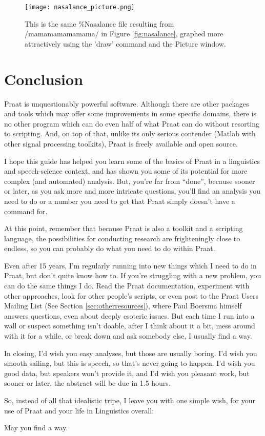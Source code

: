 \begin{figure}
  \centerline{
    \mbox{\texttt{[image: nasalance\_picture.png]}}
  }
  \caption{This is the same \%Nasalance file resulting from /mamamamamamama/ in Figure \ref{fig:nasalance}, graphed more attractively using the 'draw' command and the Picture window.}
  \label{fig:nasalancepretty}
  \end{figure}

\pagebreak

\hypertarget{conclusion}{%
\section{Conclusion}\label{conclusion}}

\label{conclusion}

Praat is unquestionably powerful software. Although there are other
packages and tools which may offer some improvements in some specific
domains, there is no other program which can do even half of what Praat
can do without resorting to scripting. And, on top of that, unlike its
only serious contender (Matlab with other signal processing toolkits),
Praat is freely available and open source.

I hope this guide has helped you learn some of the basics of Praat in a
linguistics and speech-science context, and has shown you some of its
potential for more complex (and automated) analysis. But, you're far
from ``done'', because sooner or later, as you ask more and more
intricate questions, you'll find an analysis you need to do or a number
you need to get that Praat simply doesn't have a command for.

At this point, remember that because Praat is also a toolkit and a
scripting language, the possibilities for conducting research are
frighteningly close to endless, so you can probably do what you need to
do within Praat.

Even after 15 years, I'm regularly running into new things which I need
to do in Praat, but don't quite know how to. If you're struggling with a
new problem, you can do the same things I do. Read the Praat
documentation, experiment with other approaches, look for other people's
scripts, or even post to the Praat Users Mailing List (See Section
\ref{sec:otherresources}), where Paul Boersma himself answers questions,
even about deeply esoteric issues. But each time I run into a wall or
suspect something isn't doable, after I think about it a bit, mess
around with it for a while, or break down and ask somebody else, I
usually find a way.

In closing, I'd wish you easy analyses, but those are usually boring.
I'd wish you smooth sailing, but this is speech, so that's never going
to happen. I'd wish you good data, but speakers won't provide it, and
I'd wish you pleasant work, but sooner or later, the abstract will be
due in 1.5 hours.

So, instead of all that idealistic tripe, I leave you with one simple
wish, for your use of Praat and your life in Linguistics overall:

May you find a way.
